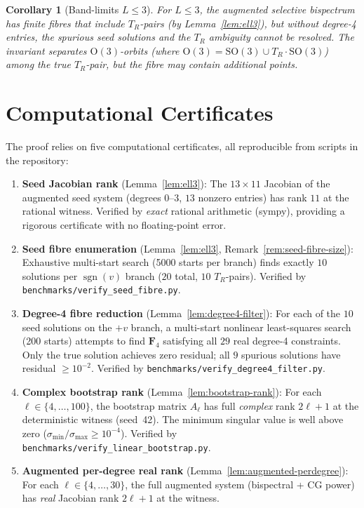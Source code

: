 \documentclass[11pt]{article}
\newtheorem{corollary}[theorem]{Corollary}
\DeclareMathOperator{\sgn}{sgn}
\newcommand{\SO}{\mathrm{SO}}
\newcommand{\OG}{\mathrm{O}}
\begin{document}
\begin{corollary}[Band-limits $L \le 3$]
For $L \le 3$, the augmented selective bispectrum has finite fibres
that include $T_R$-pairs (by Lemma~\ref{lem:ell3}), but without
degree-4 entries, the spurious seed solutions and the $T_R$ ambiguity
cannot be resolved.
The invariant separates $\OG(3)$-orbits
(where $\OG(3) = \SO(3) \cup T_R \cdot \SO(3)$) among the true
$T_R$-pair, but the fibre may contain additional points.
\end{corollary}

\section{Computational Certificates}

The proof relies on five computational certificates, all reproducible
from scripts in the repository:

\begin{enumerate}[nosep]
\item \textbf{Seed Jacobian rank} (Lemma~\ref{lem:ell3}):
  The $13 \times 11$ Jacobian of the augmented seed system
  (degrees $0$--$3$, $13$ nonzero entries) has rank $11$ at the rational
  witness.
  Verified by \emph{exact} rational arithmetic (sympy), providing a
  rigorous certificate with no floating-point error.

\item \textbf{Seed fibre enumeration} (Lemma~\ref{lem:ell3},
  Remark~\ref{rem:seed-fibre-size}):
  Exhaustive multi-start search (5000 starts per branch) finds exactly
  $10$ solutions per $\sgn(v)$ branch ($20$ total, $10$ $T_R$-pairs).
  Verified by \texttt{benchmarks/verify\_seed\_fibre.py}.

\item \textbf{Degree-4 fibre reduction}
  (Lemma~\ref{lem:degree4-filter}):
  For each of the $10$ seed solutions on the $+v$ branch, a
  multi-start nonlinear least-squares search (200 starts) attempts to
  find $\mathbf{F}_4$ satisfying all $29$ real degree-4 constraints.
  Only the true solution achieves zero residual; all $9$ spurious
  solutions have residual $\ge 10^{-2}$.
  Verified by \texttt{benchmarks/verify\_degree4\_filter.py}.

\item \textbf{Complex bootstrap rank} (Lemma~\ref{lem:bootstrap-rank}):
  For each $\ell \in \{4, \ldots, 100\}$, the bootstrap matrix $A_\ell$
  has full \emph{complex} rank $2\ell+1$ at the deterministic witness
  (seed~42).  The minimum singular value is well above zero
  ($\sigma_{\min} / \sigma_{\max} \ge 10^{-4}$).
  Verified by \texttt{benchmarks/verify\_linear\_bootstrap.py}.

\item \textbf{Augmented per-degree real rank}
  (Lemma~\ref{lem:augmented-perdegree}):
  For each $\ell \in \{4, \ldots, 30\}$, the full augmented system
  (bispectral + CG power) has \emph{real} Jacobian rank $2\ell+1$
  at the witness.
\end{enumerate}
\end{document}
